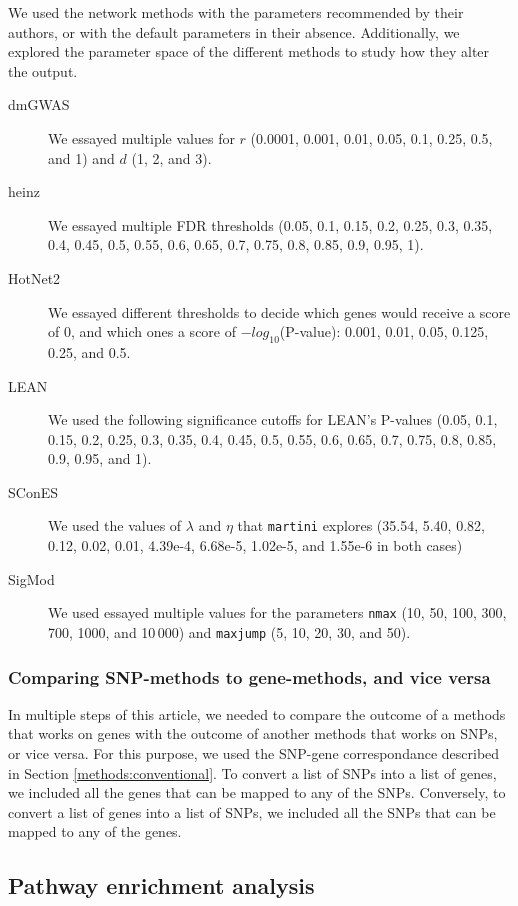 \documentclass[10pt,letterpaper]{article}
\begin{document}
We used the network methods with the parameters recommended by their authors, or with the default parameters in their absence. Additionally, we explored the parameter space of the different methods to study how they alter the output.

\begin{description}
\item[{dmGWAS}] We essayed multiple values for $r$ (0.0001, 0.001, 0.01, 0.05, 0.1, 0.25, 0.5, and 1) and $d$ (1, 2, and 3). 
\item[{heinz}] We essayed multiple FDR thresholds (0.05, 0.1, 0.15, 0.2, 0.25, 0.3, 0.35, 0.4, 0.45, 0.5, 0.55, 0.6, 0.65, 0.7, 0.75, 0.8, 0.85, 0.9, 0.95, 1).
\item[{HotNet2}] We essayed different thresholds to decide which genes would receive a score of 0, and which ones a score of $-log_{10}$(P-value): 0.001, 0.01, 0.05, 0.125, 0.25, and 0.5.
\item[{LEAN}] We used the following significance cutoffs for LEAN's P-values (0.05, 0.1, 0.15, 0.2, 0.25, 0.3, 0.35, 0.4, 0.45, 0.5, 0.55, 0.6, 0.65, 0.7, 0.75, 0.8, 0.85, 0.9, 0.95, and 1).
\item[{SConES}] We used the values of $\lambda$ and $\eta$ that \texttt{martini} explores (35.54, 5.40, 0.82, 0.12, 0.02, 0.01, 4.39e-4, 6.68e-5, 1.02e-5, and 1.55e-6 in both cases)
\item[{SigMod}] We used essayed multiple values for the parameters \texttt{nmax} (10, 50, 100, 300, 700, 1000, and 10\,000) and \texttt{maxjump} (5, 10, 20, 30, and 50).
\end{description}

\subsubsection{Comparing SNP-methods to gene-methods, and vice versa}
\label{methods:snp2gene}

In multiple steps of this article, we needed to compare the outcome of a methods that works on genes with the outcome of another methods that works on SNPs, or vice versa. For this purpose, we used the SNP-gene correspondance described in Section \ref{methods:conventional}. To convert a list of SNPs into a list of genes, we included all the genes that can be mapped to any of the SNPs. Conversely, to convert a list of genes into a list of SNPs, we included all the SNPs that can be mapped to any of the genes.

\subsection{Pathway enrichment analysis}
\label{methods:pathway_enrichment}
\end{document}
